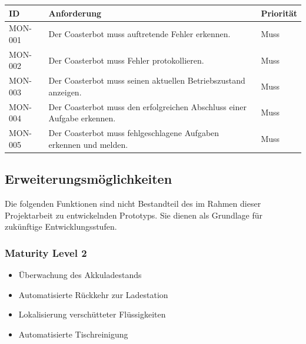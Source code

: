 \documentclass[
  a4paper,
  12pt,
  DIV=12,        %
  parskip=half,  %
  headings=small %
]{scrartcl}
\theoremstyle{definition}
\providecommand{\tightlist}{%
  \setlength{\itemsep}{0pt}\setlength{\parskip}{0pt}}
\theoremstyle{definition}
\begin{document}
\begin{longtable}[]{@{}
  >{\raggedright\arraybackslash}p{}
  >{\raggedright\arraybackslash}p{}
  >{\raggedright\arraybackslash}p{}@{}}
\toprule\noalign{}
\begin{minipage}[b]{\linewidth}\raggedright
ID
\end{minipage} & \begin{minipage}[b]{\linewidth}\raggedright
Anforderung
\end{minipage} & \begin{minipage}[b]{\linewidth}\raggedright
Priorität
\end{minipage} \\
\midrule\noalign{}
\endhead
\bottomrule\noalign{}
\endlastfoot
MON-001 & Der Coasterbot muss auftretende Fehler erkennen. & Muss \\
MON-002 & Der Coasterbot muss Fehler protokollieren. & Muss \\
MON-003 & Der Coasterbot muss seinen aktuellen Betriebszustand anzeigen.
& Muss \\
MON-004 & Der Coasterbot muss den erfolgreichen Abschluss einer Aufgabe
erkennen. & Muss \\
MON-005 & Der Coasterbot muss fehlgeschlagene Aufgaben erkennen und
melden. & Muss \\
\end{longtable}

\subsection{Erweiterungsmöglichkeiten}\label{erweiterungsmuxf6glichkeiten}

Die folgenden Funktionen sind nicht Bestandteil des im Rahmen dieser
Projektarbeit zu entwickelnden Prototyps. Sie dienen als Grundlage für
zukünftige Entwicklungsstufen.

\subsubsection{Maturity Level 2}\label{maturity-level-2}

\begin{itemize}
\tightlist
\item
  Überwachung des Akkuladestands
\item
  Automatisierte Rückkehr zur Ladestation
\item
  Lokalisierung verschütteter Flüssigkeiten
\item
  Automatisierte Tischreinigung
\end{itemize}
\end{document}
